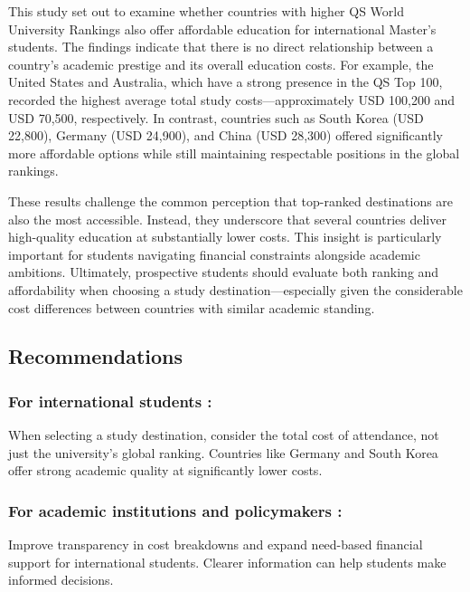 \documentclass[
  letterpaper,
  DIV=11,
  numbers=noendperiod]{scrartcl}
\begin{document}
This study set out to examine whether countries with higher QS World
University Rankings also offer affordable education for international
Master's students. The findings indicate that there is no direct
relationship between a country's academic prestige and its overall
education costs. For example, the United States and Australia, which
have a strong presence in the QS Top 100, recorded the highest average
total study costs---approximately USD 100,200 and USD 70,500,
respectively. In contrast, countries such as South Korea (USD 22,800),
Germany (USD 24,900), and China (USD 28,300) offered significantly more
affordable options while still maintaining respectable positions in the
global rankings.

These results challenge the common perception that top-ranked
destinations are also the most accessible. Instead, they underscore that
several countries deliver high-quality education at substantially lower
costs. This insight is particularly important for students navigating
financial constraints alongside academic ambitions. Ultimately,
prospective students should evaluate both ranking and affordability when
choosing a study destination---especially given the considerable cost
differences between countries with similar academic standing.

\subsection{Recommendations}\label{recommendations}

\subsubsection{For international students
:}\label{for-international-students}

When selecting a study destination, consider the total cost of
attendance, not just the university's global ranking. Countries like
Germany and South Korea offer strong academic quality at significantly
lower costs.

\subsubsection{⁠For academic institutions and policymakers
:}\label{for-academic-institutions-and-policymakers}

Improve transparency in cost breakdowns and expand need-based financial
support for international students. Clearer information can help
students make informed decisions.
\end{document}
